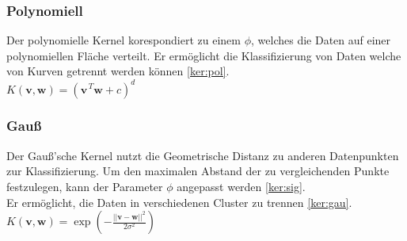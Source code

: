\documentclass[10pt,a4paper]{scrartcl}
\begin{document}
                \subsubsection{Polynomiell}
                Der polynomielle Kernel korespondiert zu einem $\phi$, welches die Daten auf einer polynomiellen Fläche verteilt.
                Er ermöglicht die Klassifizierung von Daten welche von Kurven getrennt werden können \ref{ker:pol}. \\
                $K(\boldsymbol{v}, \boldsymbol{w}) = (\boldsymbol{v}^{\, T} \boldsymbol{w} + c)^{d}$
                
                \subsubsection{Gauß}
                Der Gauß'sche Kernel nutzt die Geometrische Distanz zu anderen Datenpunkten zur Klassifizierung.
                Um den maximalen Abstand der zu vergleichenden Punkte festzulegen, kann der Parameter $\phi$ angepasst werden \ref{ker:sig}. \\
                Er ermöglicht, die Daten in verschiedenen Cluster zu trennen \ref{ker:gau}. \\
                $K(\boldsymbol{v}, \boldsymbol{w}) = \exp(-\frac{\lvert\lvert\boldsymbol{v} - \boldsymbol{w}\rvert\rvert^{2}}{2\sigma^{2}})$ \\\
                
\end{document}
